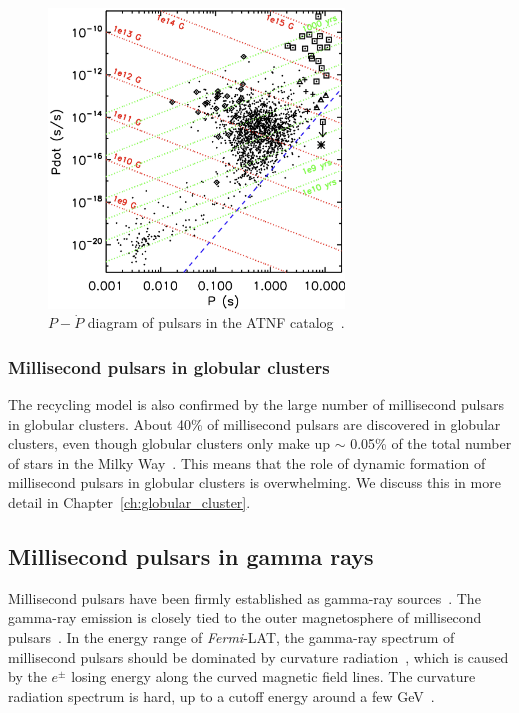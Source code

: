 \documentclass[doublespace,nopageskip]{VTthesis} %
\begin{document}
\begin{figure}[htb]
    \centering
    \includegraphics[width=0.7\textwidth]{Figures/Intro/PP.png}
    \caption{$P-\dot{P}$ diagram of pulsars in the ATNF catalog~\cite{2011AIPC.1357..269T,2005AJ....129.1993M}. }
    \label{fig:pp}
\end{figure}

\subsubsection{Millisecond pulsars in globular clusters}

The recycling model is also confirmed by the large number of millisecond pulsars in globular clusters. About 40\% of millisecond pulsars are discovered in globular clusters, even though globular clusters only make up $\sim$ 0.05\% of the total number of stars in the Milky Way~\cite{2019ApJ...877..122Y}. This means that the role of dynamic formation of millisecond pulsars in globular clusters is overwhelming. We discuss this in more detail in Chapter~\ref{ch:globular_cluster}.

\subsection{Millisecond pulsars in gamma rays}

Millisecond pulsars have been firmly established as gamma-ray sources~\citep{1996A&A...311L...9V,2009ApJ...699.1171A,2013MNRAS.430..571E,2013ApJS..208...17A}. The gamma-ray emission is closely tied to the outer magnetosphere of millisecond pulsars~\cite{2021arXiv210105751H}. In the energy range of \textit{Fermi}-LAT, the gamma-ray spectrum of millisecond pulsars should be dominated by curvature radiation~\cite{2013ApJS..208...17A}, which is caused by the $e^\pm$ losing energy along the curved magnetic field lines. The curvature radiation spectrum is hard, up to a
cutoff energy around a few GeV~\cite{2005ApJ...622..531H}.
\end{document}
